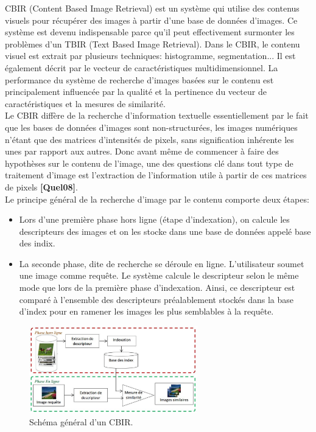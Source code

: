 CBIR (Content Based Image Retrieval) est un système qui utilise des contenus visuels pour récupérer des images à partir d'une base de données d'images. Ce système est devenu indispensable parce qu'il peut effectivement surmonter les problèmes d'un TBIR (Text Based Image Retrieval). Dans le CBIR, le contenu visuel est extrait par plusieurs techniques:
histogramme, segmentation... Il est également décrit par le vecteur de caractéristiques multidimensionnel. La performance du système de recherche d'images basées sur le contenu est principalement influencée par la qualité et la pertinence du vecteur de caractéristiques et la mesures de similarité. \\

Le CBIR diffère de la recherche d’information textuelle essentiellement par le fait que les bases de données d’images sont non-structurées, les images numériques n’étant que des matrices
d’intensités de pixels, sans signification inhérente les unes par rapport aux autres. Donc avant même de commencer à faire des hypothèses sur le contenu de l’image, une des questions clé dans tout type de traitement d’image est l’extraction de l’information utile à partir de ces matrices de pixels \textbf{[Quel08]}.\\

Le principe général de la recherche d'image par le contenu comporte deux étapes:
\begin{itemize}
	\item  Lors d'une première phase hors ligne (étape d'indexation), on calcule les descripteurs des images et on les stocke dans une base de données appelé base des indix.
	\item La seconde phase, dite de recherche se déroule en ligne. L'utilisateur soumet une image comme requête. Le système calcule le descripteur selon le même mode que lors de la première phase d'indexation. Ainsi, ce descripteur est comparé à l'ensemble des descripteurs préalablement stockés dans la base d'index pour en ramener les images les plus semblables à la requête.
\end{itemize}

\begin{figure}[H]
	    \label{fig:cbir_principe}
		\centering
		\includegraphics[width=0.65\textwidth]{Figures/cbir_principe} %
		\caption{ Schéma général d’un CBIR.}
\end{figure}

